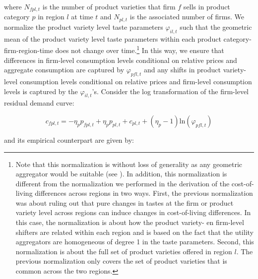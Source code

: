 \noindent where $N_{fpl,t}$ is the number of product varieties that firm $f$ sells in product category $p$ in region $l$ at time $t$ and $N_{pl,t}$ is the associated number of firms. We normalize the product variety level taste parameters $\varphi_{il,t}$ such that the geometric mean of the product variety level taste parameters within each product category-firm-region-time does not change over time.\footnote{Note that this normalization is without loss of generality as any geometric aggregator would be suitable (see \cite{Redding2020}). In addition, this normalization is different from the normalization we performed in the derivation of the cost-of-living differences across regions in two ways. First, the previous normalization was about ruling out that pure changes in tastes at the firm or product variety level across regions can induce changes in cost-of-living differences. In this case, the normalization is about how the product variety- en firm-level shifters are related within each region and is based on the fact that the utility aggregators are homogeneous of degree 1 in the taste parameters. Second, this normalization is about the full set of product varieties offered in region $l$. The previous normalization only covers the set of product varieties that is common across the two regions.} In this way, we ensure that differences in firm-level consumption levels conditional on relative prices and aggregate consumption are captured by $\varphi_{pfl,t}$ and any shifts in product variety-level consumption levels conditional on relative prices and firm-level consumption levels is captured by the $\varphi_{il,t}$'s. Consider the log transformation of the firm-level residual demand curve: 
\begin{linenomath*}
    \begin{equation*}
        c_{fpl,t} = - \eta_p p_{fpl,t} + \eta_p p_{pl,t} + c_{pl,t} + (\eta_p-1)\text{ln}\left(\varphi_{pfl,t}\right)
    \end{equation*} 
\end{linenomath*}

\noindent and its empirical counterpart are given by: 

